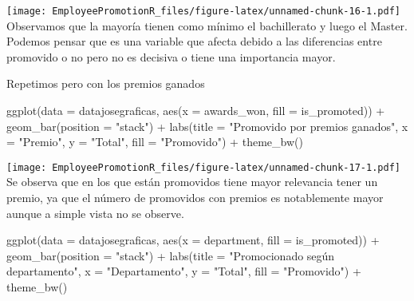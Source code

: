\documentclass[
]{article}
\newenvironment{Shaded}{\begin{snugshade}}{\end{snugshade}}
\newcommand{\AttributeTok}[1]{\textcolor[rgb]{0.77,0.63,0.00}{#1}}
\newcommand{\FunctionTok}[1]{\textcolor[rgb]{0.00,0.00,0.00}{#1}}
\newcommand{\NormalTok}[1]{#1}
\newcommand{\SpecialCharTok}[1]{\textcolor[rgb]{0.00,0.00,0.00}{#1}}
\newcommand{\StringTok}[1]{\textcolor[rgb]{0.31,0.60,0.02}{#1}}
\begin{document}
\texttt{[image: EmployeePromotionR\_files/figure-latex/unnamed-chunk-16-1.pdf]}
Observamos que la mayoría tienen como mínimo el bachillerato y luego el
Master. Podemos pensar que es una variable que afecta debido a las
diferencias entre promovido o no pero no es decisiva o tiene una
importancia mayor.

Repetimos pero con los premios ganados

\begin{Shaded}
\begin{Highlighting}[]
\FunctionTok{ggplot}\NormalTok{(}\AttributeTok{data =}\NormalTok{ datajosegraficas, }\FunctionTok{aes}\NormalTok{(}\AttributeTok{x =}\NormalTok{ awards\_won, }\AttributeTok{fill =}\NormalTok{ is\_promoted)) }\SpecialCharTok{+}
  \FunctionTok{geom\_bar}\NormalTok{(}\AttributeTok{position =} \StringTok{"stack"}\NormalTok{) }\SpecialCharTok{+}
  \FunctionTok{labs}\NormalTok{(}\AttributeTok{title =} \StringTok{"Promovido por premios ganados"}\NormalTok{, }
       \AttributeTok{x =} \StringTok{"Premio"}\NormalTok{, }
       \AttributeTok{y =} \StringTok{"Total"}\NormalTok{,}
       \AttributeTok{fill =} \StringTok{"Promovido"}\NormalTok{) }\SpecialCharTok{+}
  \FunctionTok{theme\_bw}\NormalTok{()}
\end{Highlighting}
\end{Shaded}

\texttt{[image: EmployeePromotionR\_files/figure-latex/unnamed-chunk-17-1.pdf]}
Se observa que en los que están promovidos tiene mayor relevancia tener
un premio, ya que el número de promovidos con premios es notablemente
mayor aunque a simple vista no se observe.

\begin{Shaded}
\begin{Highlighting}[]
\FunctionTok{ggplot}\NormalTok{(}\AttributeTok{data =}\NormalTok{ datajosegraficas, }\FunctionTok{aes}\NormalTok{(}\AttributeTok{x =}\NormalTok{ department, }\AttributeTok{fill =}\NormalTok{ is\_promoted)) }\SpecialCharTok{+}
  \FunctionTok{geom\_bar}\NormalTok{(}\AttributeTok{position =} \StringTok{"stack"}\NormalTok{) }\SpecialCharTok{+}
  \FunctionTok{labs}\NormalTok{(}\AttributeTok{title =} \StringTok{"Promocionado según departamento"}\NormalTok{, }
       \AttributeTok{x =} \StringTok{"Departamento"}\NormalTok{, }
       \AttributeTok{y =} \StringTok{"Total"}\NormalTok{,}
       \AttributeTok{fill =} \StringTok{"Promovido"}\NormalTok{) }\SpecialCharTok{+}
  \FunctionTok{theme\_bw}\NormalTok{()}
\end{Highlighting}
\end{Shaded}
\end{document}
